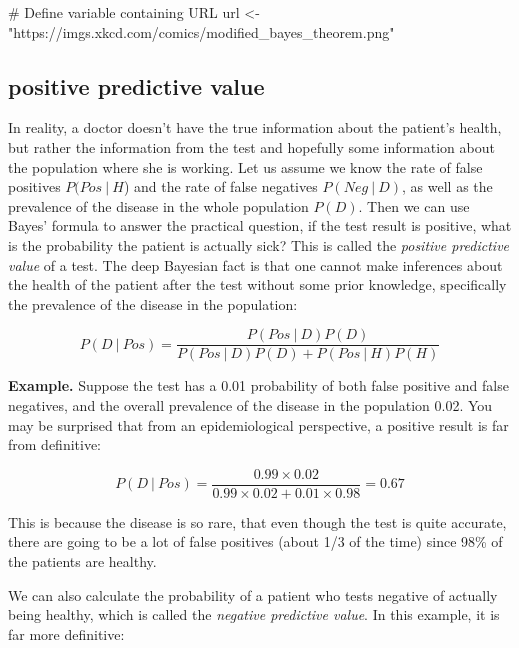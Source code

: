 \documentclass[
  letterpaper,
  DIV=11,
  numbers=noendperiod]{scrreprt}
\newenvironment{Shaded}{\begin{snugshade}}{\end{snugshade}}
\newcommand{\NormalTok}[1]{\textcolor[rgb]{0.00,0.23,0.31}{#1}}
\begin{document}
\begin{Shaded}
\begin{Highlighting}[]
\NormalTok{\# Define variable containing URL}
\NormalTok{url \textless{}{-} "https://imgs.xkcd.com/comics/modified\_bayes\_theorem.png"}
\end{Highlighting}
\end{Shaded}

\subsection{positive predictive value}\label{positive-predictive-value}

In reality, a doctor doesn't have the true information about the
patient's health, but rather the information from the test and hopefully
some information about the population where she is working. Let us
assume we know the rate of false positives \(P(Pos \ \vert \ H\)) and
the rate of false negatives \(P(Neg \ \vert \  D)\), as well as the
prevalence of the disease in the whole population \(P(D)\). Then we can
use Bayes' formula to answer the practical question, if the test result
is positive, what is the probability the patient is actually sick? This
is called the \emph{positive predictive value} of a test. The deep
Bayesian fact is that one cannot make inferences about the health of the
patient after the test without some prior knowledge, specifically the
prevalence of the disease in the population:

\[ P(D  \ \vert \  Pos) =  \frac{P(Pos \ \vert \ D)P(D)}{P(Pos \ \vert \ D) P(D) + P(Pos  \ \vert \  H)P(H)}\]

\textbf{Example.} Suppose the test has a 0.01 probability of both false
positive and false negatives, and the overall prevalence of the disease
in the population 0.02. You may be surprised that from an
epidemiological perspective, a positive result is far from definitive:

\[ P(D  \ \vert \  Pos)  = \frac{0.99 \times 0.02}{0.99 \times 0.02 + 0.01 \times 0.98} = 0.67 \]

This is because the disease is so rare, that even though the test is
quite accurate, there are going to be a lot of false positives (about
1/3 of the time) since 98\% of the patients are healthy.

We can also calculate the probability of a patient who tests negative of
actually being healthy, which is called the \emph{negative predictive
value}. In this example, it is far more definitive:
\end{document}
